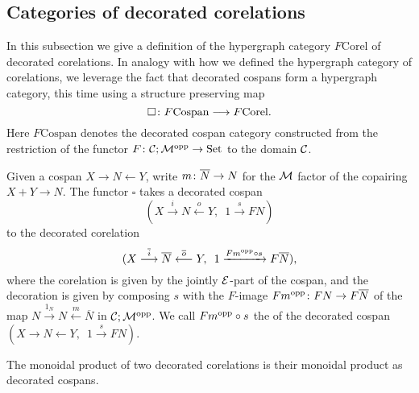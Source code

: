 \subsection{Categories of decorated corelations}
In this subsection we give a definition of the hypergraph category
$F\mathrm{Corel}$ of decorated corelations.  In analogy with how we defined the
hypergraph category of corelations, we leverage the fact that decorated cospans
form a hypergraph category, this time using a structure preserving map 
\[
  \square{\colon} F\mathrm{Cospan} \longrightarrow F\mathrm{Corel}.
\]
Here $F\mathrm{Cospan}$ denotes the decorated cospan category constructed from
the restriction of the functor $F{\colon} \mathcal C;\mathcal M^{\mathrm{opp}} \to \mathrm{Set}$ to the domain
$\mathcal C$. 

Given a cospan $X \to N \leftarrow Y$, write $m{\colon} \overline{N} \to N$ for the
$\mathcal M$ factor of the copairing $X+Y \to N$. The functor $\square$ takes a
decorated cospan 
\[
  (X \stackrel{i}\longrightarrow N \stackrel{o}\longleftarrow Y, \enspace 1
    \stackrel{s}\longrightarrow FN)
\]
to the decorated corelation 
\[
  (X \stackrel{\overline{i}}\longrightarrow \overline N
  \stackrel{\overline{o}}{\longleftarrow} Y, \enspace 1 \xrightarrow{Fm^{\mathrm{opp}} \circ
  s} F\overline{N}),
\]
where the corelation is given by the jointly $\mathcal E$-part of the cospan, and the
decoration is given by composing $s$ with the $F$-image $Fm^{\mathrm{opp}}{\colon} FN \to
F\overline{N}$ of the map $N \stackrel{1_N}\to N \stackrel{m}\leftarrow
\overline{N}$ in $\mathcal C;\mathcal M^{\mathrm{opp}}$. We call $Fm^{\mathrm{opp}} \circ s$ the
 of the decorated cospan $(X \to N \leftarrow Y,
\enspace 1 \stackrel{s}\to FN)$.

The monoidal product of two decorated corelations is their monoidal product as
decorated cospans.

